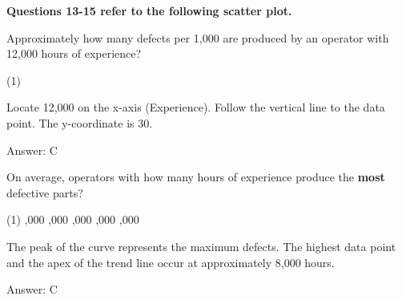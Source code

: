 \documentclass[11pt,paper=a4,answers]{exam}
\begin{document}
\begin{questions}
\textbf{Questions 13-15 refer to the following scatter plot.}

\begin{center}
\end{center}

\question
Approximately how many defects per 1,000 are produced by an operator with 12,000 hours of experience?

\begin{tasks}(1)
    
\end{tasks}

\begin{solution}
Locate 12,000 on the x-axis (Experience).
\vspace{5pt}
Follow the vertical line to the data point.
\vspace{5pt}
The y-coordinate is 30.

Answer: \colorbox{yellow!100}{C}
\end{solution}

\vspace{1cm}

\question
On average, operators with how many hours of experience produce the \textbf{most} defective parts?

\begin{tasks}(1)
,000 ,000 ,000 ,000 ,000
\end{tasks}

\begin{solution}
The peak of the curve represents the maximum defects.
\vspace{5pt}
The highest data point and the apex of the trend line occur at approximately 8,000 hours.

Answer: \colorbox{yellow!100}{C}
\end{solution}


\end{questions}
\end{document}
